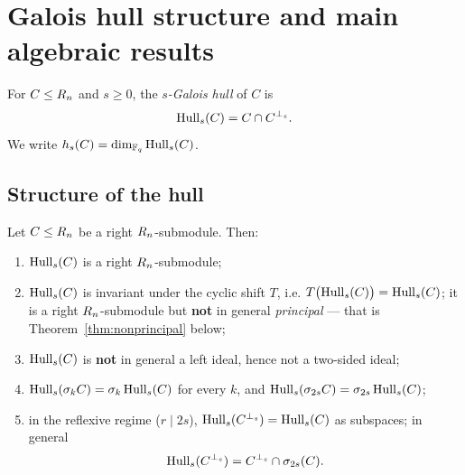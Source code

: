 \section{Galois hull structure and main algebraic results}
\label{sec:hulls}

\begin{definition}\label{def:hull}
For $C\le R_n$ and $s\ge0$, the \emph{$s$-Galois hull} of $C$ is
\[
  \operatorname{Hull}_s(C)=C\cap C^{\perp_s}.
\]
We write $h_s(C)=\dim_{\mathbb F_q}\operatorname{Hull}_s(C)$.
\end{definition}

\subsection{Structure of the hull}

\begin{theorem}\label{thm:hullstruct}
Let $C\le R_n$ be a right $R_n$-submodule. Then:
\begin{enumerate}[label=\textnormal{(\alph*)},leftmargin=*]
\item $\operatorname{Hull}_s(C)$ is a right $R_n$-submodule;
\item $\operatorname{Hull}_s(C)$ is invariant under the cyclic shift $T$, i.e.
  $T\bigl(\operatorname{Hull}_s(C)\bigr)=\operatorname{Hull}_s(C)$; it is a right $R_n$-submodule but
  \textbf{not} in general \emph{principal} --- that is
  Theorem~\ref{thm:nonprincipal} below;
\item $\operatorname{Hull}_s(C)$ is \textbf{not} in general a left ideal, hence not a
  two-sided ideal;
\item $\operatorname{Hull}_s(\sigma_kC)=\sigma_k\operatorname{Hull}_s(C)$ for every $k$, and
  $\operatorname{Hull}_s(\sigma_{2s}C)=\sigma_{2s}\operatorname{Hull}_s(C)$;
\item in the reflexive regime ($r\mid 2s$), $\operatorname{Hull}_s(C^{\perp_s})
  =\operatorname{Hull}_s(C)$ as subspaces; in general
  \[
    \operatorname{Hull}_s(C^{\perp_s})=C^{\perp_s}\cap\sigma_{2s}(C).
  \]
\end{enumerate}
\end{theorem}

